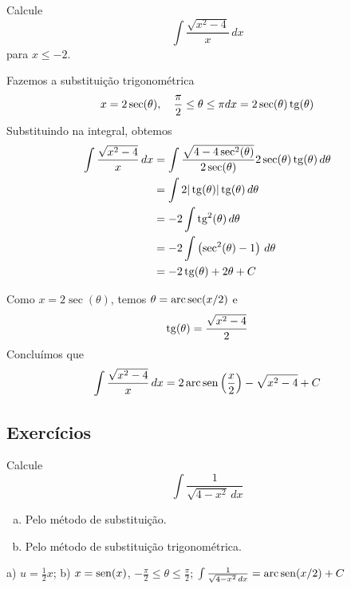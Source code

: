 \begin{exeresol}
  Calcule
  \begin{equation}
    \int\frac{\sqrt{x^2-4}}{x}\,dx
  \end{equation}
  para $x\leq -2$.
\end{exeresol}
\begin{resol}
  Fazemos a substituição trigonométrica
  \begin{equation}
    x = 2\sec(\theta),\quad \frac{\pi}{2}\leq\theta\leq\pi\\
    dx = 2\sec(\theta)\operatorname{tg}(\theta)
  \end{equation}
  Substituindo na integral, obtemos
  \begin{align}
    \int\frac{\sqrt{x^2-4}}{x}\,dx &= \int\frac{\sqrt{4-4\sec^2(\theta)}}{2\sec(\theta)}2\sec(\theta)\operatorname{tg}(\theta)\,d\theta\\
                                   &= \int 2|\operatorname{tg}(\theta)|\operatorname{tg}(\theta)\,d\theta\\
                                   &= -2\int\operatorname{tg}^2(\theta)\,d\theta\\
                                   &= -2\int\left(\sec^2(\theta)-1\right)\,d\theta\\
                                   &= -2\operatorname{tg}(\theta) + 2\theta + C
  \end{align}
  
  Como $x = 2\sec(\theta)$, temos $\theta = \operatorname{arc}\sec(x/2)$ e
  \begin{align}
    \operatorname{tg}(\theta) = \frac{\sqrt{x^2-4}}{2}
  \end{align}
  Concluímos que
  \begin{equation}
    \int\frac{\sqrt{x^2-4}}{x}\,dx = 2\operatorname{arc}\operatorname{sen}\left(\frac{x}{2}\right) - \sqrt{x^2-4} + C
  \end{equation}
\end{resol}

\subsection{Exercícios}

\begin{exer}
  Calcule
  \begin{equation}
    \int\frac{1}{\sqrt{4-x^2}\,dx}
  \end{equation}
  \begin{enumerate}[a)]
  \item Pelo método de substituição.
  \item Pelo método de substituição trigonométrica.
  \end{enumerate}
\end{exer}
\begin{resp}
  a) $u = \frac{1}{2}x$; b) $x = \operatorname{sen}(x)$, $-\frac{\pi}{2}\leq\theta\leq\frac{\pi}{2}$; $\int\frac{1}{\sqrt{4-x^2}\,dx} = \operatorname{arc}\operatorname{sen}(x/2) + C$
\end{resp}

